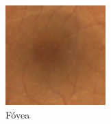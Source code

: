 \documentclass[xcolor=dvipsnames,table]{beamer}
\begin{document}
\begin{frame}
\begin{center}
{\begin{minipage}[t]{0.1\linewidth}
			\includegraphics[width=\linewidth]{my_images/contextualizacion/image1.png}\\[0.5ex]
			\footnotesize Fóvea
		\end{minipage}\hspace{0.5cm}%
	}%
\end{center}
\end{frame}
\end{document}
